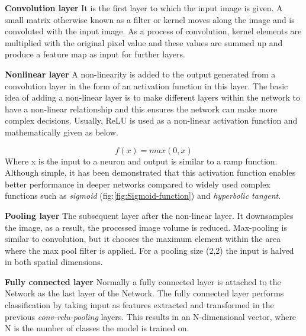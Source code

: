 \newpara \textbf{Convolution layer} It is the first layer to which the input image is given. A small matrix otherwise known as a filter or kernel moves along the image and is convoluted with the input image. As a process of convolution, kernel elements are multiplied with the original pixel value and these values are summed up and produce a feature map as input for further layers.
 
\newpara \textbf{Nonlinear layer}
A non-linearity is added to the output generated from a convolution layer in the form of an activation function in this layer. The basic idea of adding a non-linear layer is to make different layers within the network to have a non-linear relationship and this ensures the network can make more complex decisions.
Usually, ReLU is used as a non-linear activation function and mathematically given as below.

\begin{equation}
	f(x) =max(0, x)
\end {equation}
Where x is the input to a neuron and output is similar to a ramp function.
Although simple, it has been demonstrated that this activation function enables better performance in deeper networks compared to widely used complex functions such as \textit{sigmoid} (fig:\ref{fig:Sigmoid-function}) and \textit{hyperbolic tangent}. %

\newpara \textbf{Pooling layer}
The subsequent layer after the non-linear layer. It downsamples the image, as a result, the processed image volume is reduced. Max-pooling is similar to convolution, but it chooses the maximum element within the area where the max pool filter is applied. For a pooling size (2,2) the input is halved in both spatial dimensions.

\newpara \textbf{Fully connected layer}
Normally a fully connected layer is attached to the Network as the last layer of the Network. The fully connected layer performs classification by taking input as features extracted and transformed in the previous \textit{conv-relu-pooling} layers. This results in an N-dimensional vector, where N is the number of classes the model is trained on.

